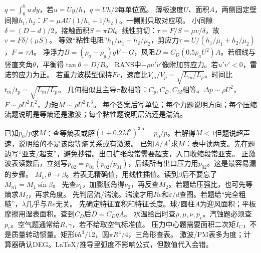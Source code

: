 $q=\int_0^hu\,dy$，若$u=Uy/h$，$q=Uh/2$每单位宽。
薄板速度$U$、面积$A$，两侧固定壁间隙$h_1,h_2$：$F=\mu AU(1/h_1+1/h_2)$。一侧则只取对应项。
小间隙$\delta=(D-d)/2$，接触面积$S=\pi Dl$。线性剪切：$\tau=F/S=\mu v/\delta$，故$v=F\delta/(\mu S)$。
等效“粘性电阻”$h_1/\mu_1+h_2/\mu_2$，剪应力$\tau=U/(h_1/\mu_1+h_2/\mu_2)$，$F=\tau A$。
净浮力$B=(\rho_a-\rho_g)gV-G$，风阻$D=C_D(0.5\rho_aU^2)A$。若细线与竖直夹角$\theta$，平衡得$\tan\theta=D/B$。
RANS中$-\rho\overline{u'v'}$像附加剪应力。若$\overline{u'v'}<0$，雷诺剪应力为正。
若重力波模型保持$Fr$，速度比$V_m/V_p=\sqrt{L_m/L_p}$。时间比$t_m/t_p=\sqrt{L_m/L_p}$。
几何相似且主导$\pi$数相等：$C_p,C_D,C_M$相等。$\Delta p\sim\rho U^2$，$F\sim\rho U^2L^2$，力矩$M\sim\rho U^2L^3$。
每个答案后写单位；每个力题说明方向；每个压缩流题说明是等熵还是激波；每个粘性题说明层流还是湍流。

已知$p_0/p$求$M$：查等熵表或解$(1+0.2M^2)^{3.5}=p_0/p$。若解得$M<1$但题说超声速，说明给的不是该段等熵关系或有激波。
已知$A/A^*$求$M$：表中读两支。先在题边写“亚支/超支”，避免抄错。出口扩张段常需要超支，入口收缩段常亚支。
正激波表读数后，立刻写$p_{02}=p_{01}(p_{02}/p_{01})$，后续所有出口压力用$p_{02}$。这是最容易漏的步骤。
$M_1,\theta\to\beta$。若表无精确值，用线性插值。读到$\beta$后不要忘了$M_{n1}=M_1\sin\beta$。
先查$\nu_1$，加膨胀角得$\nu_2$，再反查$M_2$。若题给压强比，也可先等熵求$M_2$，再求角度。
先判层流/湍流。湍流才用$Re$和$\varepsilon/d$查图。若题给“完全粗糙”，$\lambda$几乎与$Re$无关。
先确定特征面积和特征长度。球/圆柱$A$为迎风面积；平板摩擦用湿表面积。查到$C_D$后$D=C_DqA$。
水温给出时查$\rho,\mu,\nu,p_v$。汽蚀题必须查$p_v$。空气题通常给$R,\gamma$，若不给取空气标准值。
压力中心题需要面积二次矩$I_C$，不是质量转动惯量。矩形$bh^3/12$，圆$\pi R^4/4$，三角形查表。
激波/PM表多为度；计算器确认DEG。LaTeX/推导里弧度不影响公式，但数值代入会错。

